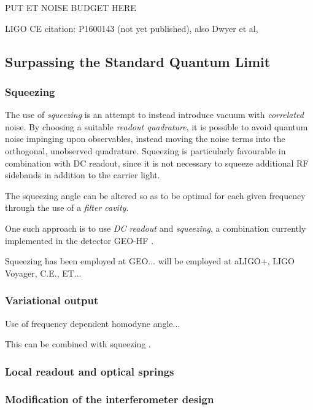 PUT ET NOISE BUDGET HERE

LIGO CE citation: P1600143 (not yet published), also Dwyer et al, \cite{Dwyer2015}

\subsection{\label{sec:sub-sql-techniques}Surpassing the Standard Quantum Limit}



\subsubsection{\label{sec:squeezing}Squeezing}

The use of \emph{squeezing} is an attempt to instead introduce vacuum with \emph{correlated} noise. By choosing a suitable \emph{readout quadrature}, it is possible to avoid quantum noise impinging upon observables, instead moving the noise terms into the orthogonal, unobserved quadrature. Squeezing is particularly favourable in combination with DC readout, since it is not necessary to squeeze additional \gls{RF} sidebands in addition to the carrier light.

The squeezing angle can be altered so as to be optimal for each given frequency through the use of a \emph{filter cavity}.

One such approach is to use \emph{DC readout} and \emph{squeezing}, a combination currently implemented in the detector GEO-HF \cite{Willke2006, Affeldt2014}.

Squeezing has been employed at GEO... will be employed at aLIGO+, LIGO Voyager, C.E., ET...

\subsubsection{Variational output}
Use of frequency dependent homodyne angle...

This can be combined with squeezing \cite{Kimble2001}.

\subsubsection{Local readout and optical springs}

\subsubsection{Modification of the interferometer design}

